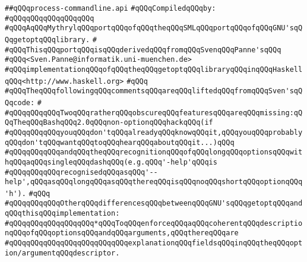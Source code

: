 \label{src/lib/src/process-commandline.api}
\verb|##qQQqprocess-commandline.api|\newline
\newline
\verb|#qQQqCompiledqQQqby:|\newline
\verb|#qQQqqQQqqQQqqQQqqQQq|\newline
\newline
\newline
\newline
\verb|#qQQqAqQQqMythrylqQQqportqQQqofqQQqtheqQQqSMLqQQqportqQQqofqQQqGNU'sqQQqgetoptqQQqlibrary.|\newline
\verb|#|\newline
\verb|#qQQqThisqQQqportqQQqisqQQqderivedqQQqfromqQQqSvenqQQqPanne'sqQQq|\newline
\verb|#qQQq<Sven.Panne@informatik.uni-muenchen.de>|\newline
\verb|#qQQqimplementationqQQqofqQQqtheqQQqgetoptqQQqlibraryqQQqinqQQqHaskellqQQq<http://www.haskell.org>|\newline
\verb|#qQQq|\newline
\verb|#qQQqTheqQQqfollowingqQQqcommentsqQQqareqQQqliftedqQQqfromqQQqSven'sqQQqcode:|\newline
\verb|#|\newline
\verb|#qQQqqQQqqQQqTwoqQQqratherqQQqobscureqQQqfeaturesqQQqareqQQqmissing:qQQqTheqQQqBashqQQq2.0qQQqnon-optionqQQqhackqQQq(if|\newline
\verb|#qQQqqQQqqQQqyouqQQqdon'tqQQqalreadyqQQqknowqQQqit,qQQqyouqQQqprobablyqQQqdon'tqQQqwantqQQqtoqQQqhearqQQqaboutqQQqit...)qQQq|\newline
\verb|#qQQqqQQqqQQqandqQQqtheqQQqrecognitionqQQqofqQQqlongqQQqoptionsqQQqwithqQQqaqQQqsingleqQQqdashqQQq(e.g.qQQq'-help'qQQqis|\newline
\verb|#qQQqqQQqqQQqrecognisedqQQqasqQQq'--help',qQQqasqQQqlongqQQqasqQQqthereqQQqisqQQqnoqQQqshortqQQqoptionqQQq'h').|\newline
\verb|#qQQq|\newline
\verb|#qQQqqQQqqQQqOtherqQQqdifferencesqQQqbetweenqQQqGNU'sqQQqgetoptqQQqandqQQqthisqQQqimplementation:|\newline
\verb|#qQQqqQQqqQQqqQQqqQQq*qQQqToqQQqenforceqQQqaqQQqcoherentqQQqdescriptionqQQqofqQQqoptionsqQQqandqQQqarguments,qQQqthereqQQqare|\newline
\verb|#qQQqqQQqqQQqqQQqqQQqqQQqqQQqexplanationqQQqfieldsqQQqinqQQqtheqQQqoption/argumentqQQqdescriptor.|\newline
